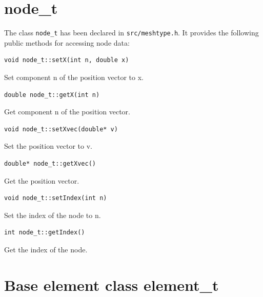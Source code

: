 \section{node\_t}

The class {\tt node\_t} has been declared in {\tt src/meshtype.h}. It provides the
following public methods for accessing node data:
\begin{verbatim}
void node_t::setX(int n, double x)
\end{verbatim}
Set component n of the position vector to x.
\begin{verbatim} 
double node_t::getX(int n)
\end{verbatim}
Get component n of the position vector.
\begin{verbatim} 
void node_t::setXvec(double* v)
\end{verbatim}
Set the position vector to v.
\begin{verbatim} 
double* node_t::getXvec()
\end{verbatim}
Get the position vector.
\begin{verbatim}
void node_t::setIndex(int n)
\end{verbatim}
Set the index of the node to n.
\begin{verbatim} 
int node_t::getIndex()
\end{verbatim}
Get the index of the node.

\section{Base element class element\_t}

